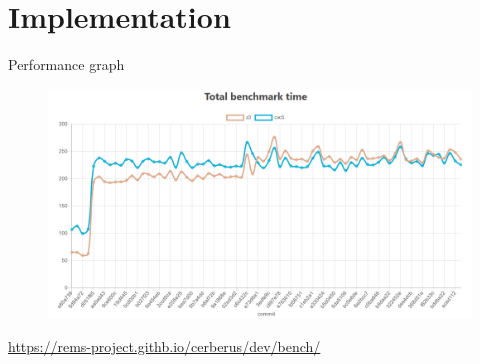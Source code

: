 \section{Implementation}

Performance graph

\begin{figure}[h]
    \centering
    \includegraphics[width=\textwidth]{../misc/vip-performance-hit.png}
\end{figure}

\url{https://rems-project.githb.io/cerberus/dev/bench/}

